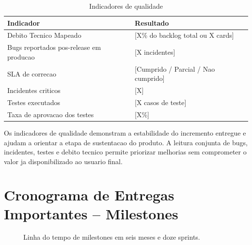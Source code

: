 \documentclass[12pt,a4paper]{article}
\newcommand{\placeholder}[1]{\textcolor{MediumGray}{[#1]}}
\begin{document}
\begin{table}[H]
  \centering
  \caption{Indicadores de qualidade}
  \begin{tabularx}{\textwidth}{@{}L{6.5cm}Y@{}}
    \toprule
    \textbf{Indicador} & \textbf{Resultado} \\
    \midrule
    Debito Tecnico Mapeado & \placeholder{X\% do backlog total ou X cards} \\
    Bugs reportados pos-release em producao & \placeholder{X incidentes} \\
    SLA de correcao & \placeholder{Cumprido / Parcial / Nao cumprido} \\
    Incidentes criticos & \placeholder{X} \\
    Testes executados & \placeholder{X casos de teste} \\
    Taxa de aprovacao dos testes & \placeholder{X\%} \\
    \bottomrule
  \end{tabularx}
\end{table}

Os indicadores de qualidade demonstram a estabilidade do incremento entregue e ajudam a orientar a etapa de sustentacao do produto. A leitura conjunta de bugs, incidentes, testes e debito tecnico permite priorizar melhorias sem comprometer o valor ja disponibilizado ao usuario final.

\section{Cronograma de Entregas Importantes -- Milestones}

\begin{figure}[H]
  \centering
  \caption{Linha do tempo de milestones em seis meses e doze sprints.}
\end{figure}
\end{document}
